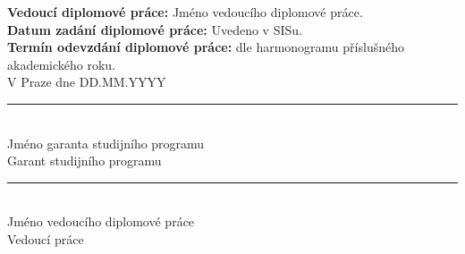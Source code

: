 {\noindent\textbf{Vedoucí diplomové práce:} Jméno vedoucího diplomové práce.\\[3mm]
\noindent\textbf{Datum zadání diplomové práce:} Uvedeno v SISu.\\[3mm]
\noindent\textbf{Termín odevzdání diplomové práce:} dle harmonogramu příslušného akademického roku.\\[16mm]
\noindent V Praze dne DD.MM.YYYY\\[26mm]

\noindent\begin{minipage}{0.48\textwidth}\centering
\rule{5.5cm}{0.4pt}\\[1mm]
Jméno garanta studijního programu\\
Garant studijního programu
\end{minipage}\hfill
\begin{minipage}{0.48\textwidth}\centering
\rule{5.5cm}{0.4pt}\\[1mm]
Jméno vedoucího diplomové práce\\
Vedoucí práce
\end{minipage}

\newpage
}